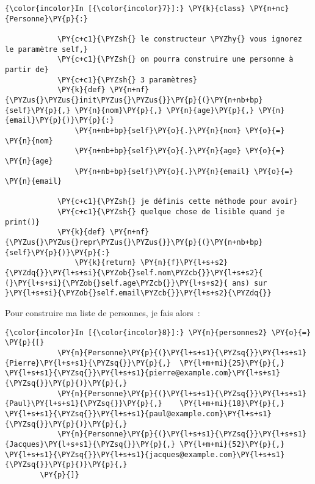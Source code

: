     \begin{Verbatim}[commandchars=\\\{\},frame=single,framerule=0.3mm,rulecolor=\color{cellframecolor}]
{\color{incolor}In [{\color{incolor}7}]:} \PY{k}{class} \PY{n+nc}{Personne}\PY{p}{:}
        
            \PY{c+c1}{\PYZsh{} le constructeur \PYZhy{} vous ignorez le paramètre self,}
            \PY{c+c1}{\PYZsh{} on pourra construire une personne à partir de}
            \PY{c+c1}{\PYZsh{} 3 paramètres}
            \PY{k}{def} \PY{n+nf}{\PYZus{}\PYZus{}init\PYZus{}\PYZus{}}\PY{p}{(}\PY{n+nb+bp}{self}\PY{p}{,} \PY{n}{nom}\PY{p}{,} \PY{n}{age}\PY{p}{,} \PY{n}{email}\PY{p}{)}\PY{p}{:}
                \PY{n+nb+bp}{self}\PY{o}{.}\PY{n}{nom} \PY{o}{=} \PY{n}{nom}
                \PY{n+nb+bp}{self}\PY{o}{.}\PY{n}{age} \PY{o}{=} \PY{n}{age}
                \PY{n+nb+bp}{self}\PY{o}{.}\PY{n}{email} \PY{o}{=} \PY{n}{email}
        
            \PY{c+c1}{\PYZsh{} je définis cette méthode pour avoir}
            \PY{c+c1}{\PYZsh{} quelque chose de lisible quand je print()}
            \PY{k}{def} \PY{n+nf}{\PYZus{}\PYZus{}repr\PYZus{}\PYZus{}}\PY{p}{(}\PY{n+nb+bp}{self}\PY{p}{)}\PY{p}{:}
                \PY{k}{return} \PY{n}{f}\PY{l+s+s2}{\PYZdq{}}\PY{l+s+si}{\PYZob{}self.nom\PYZcb{}}\PY{l+s+s2}{ (}\PY{l+s+si}{\PYZob{}self.age\PYZcb{}}\PY{l+s+s2}{ ans) sur }\PY{l+s+si}{\PYZob{}self.email\PYZcb{}}\PY{l+s+s2}{\PYZdq{}}
\end{Verbatim}


    Pour construire ma liste de personnes, je fais alors~:

    \begin{Verbatim}[commandchars=\\\{\},frame=single,framerule=0.3mm,rulecolor=\color{cellframecolor}]
{\color{incolor}In [{\color{incolor}8}]:} \PY{n}{personnes2} \PY{o}{=} \PY{p}{[}
            \PY{n}{Personne}\PY{p}{(}\PY{l+s+s1}{\PYZsq{}}\PY{l+s+s1}{Pierre}\PY{l+s+s1}{\PYZsq{}}\PY{p}{,}  \PY{l+m+mi}{25}\PY{p}{,} \PY{l+s+s1}{\PYZsq{}}\PY{l+s+s1}{pierre@example.com}\PY{l+s+s1}{\PYZsq{}}\PY{p}{)}\PY{p}{,}
            \PY{n}{Personne}\PY{p}{(}\PY{l+s+s1}{\PYZsq{}}\PY{l+s+s1}{Paul}\PY{l+s+s1}{\PYZsq{}}\PY{p}{,}    \PY{l+m+mi}{18}\PY{p}{,} \PY{l+s+s1}{\PYZsq{}}\PY{l+s+s1}{paul@example.com}\PY{l+s+s1}{\PYZsq{}}\PY{p}{)}\PY{p}{,}
            \PY{n}{Personne}\PY{p}{(}\PY{l+s+s1}{\PYZsq{}}\PY{l+s+s1}{Jacques}\PY{l+s+s1}{\PYZsq{}}\PY{p}{,} \PY{l+m+mi}{52}\PY{p}{,} \PY{l+s+s1}{\PYZsq{}}\PY{l+s+s1}{jacques@example.com}\PY{l+s+s1}{\PYZsq{}}\PY{p}{)}\PY{p}{,}
        \PY{p}{]}
\end{Verbatim}


